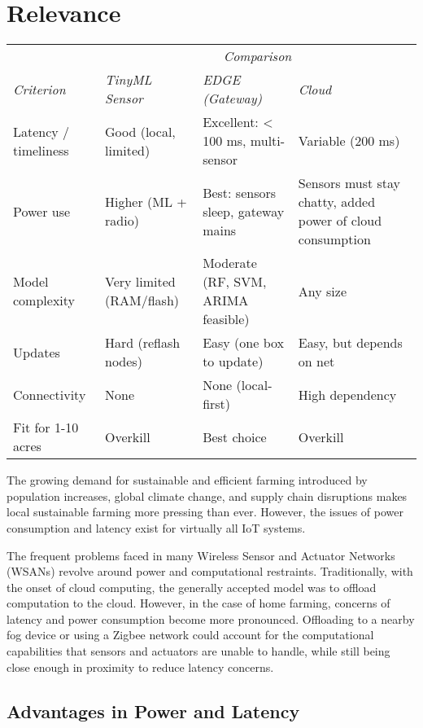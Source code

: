 \documentclass{sigchi}
\begin{document}
\section{Relevance}
\begin{table*}[btp]
	\centering
	\begin{tabular}{l p{4cm} p{4cm} p{4cm}}
		& \multicolumn{3}{c}{\textit{Comparison}} \\
		\cmidrule(r){2-4}
		{\small\textit{Criterion}}
		& {\small\textit{TinyML Sensor}}
		& {\small\textit{EDGE (Gateway)}}
		& {\small\textit{Cloud}} \\
		\midrule
		Latency / timeliness & Good (local, limited) & Excellent: < 100 ms, multi-sensor & Variable (200 ms) \\
		\midrule
		Power use & Higher (ML + radio) & Best: sensors sleep, gateway mains & Sensors must stay chatty, added power of cloud consumption \\
		\midrule
		Model complexity & Very limited (RAM/flash) & Moderate (RF, SVM, ARIMA feasible) & Any size \\
		\midrule
		Updates & Hard (reflash nodes) & Easy (one box to update) & Easy, but depends on net \\
		\midrule
		Connectivity & None & None (local-first) & High dependency \\
		\midrule
		Fit for 1-10 acres & Overkill & Best choice & Overkill \\
	\end{tabular}
\end{table*}

The growing demand for sustainable and efficient farming introduced by population increases, global climate change, and supply chain disruptions makes local sustainable farming more pressing than ever. However, the issues of power consumption and latency exist for virtually all IoT systems.

The frequent problems faced in many Wireless Sensor and Actuator Networks (WSANs) revolve around power and computational restraints. Traditionally, with the onset of cloud computing, the generally accepted model was to offload computation to the cloud. However, in the case of home farming, concerns of latency and power consumption become more pronounced. Offloading to a nearby fog device or using a Zigbee network could account for the computational capabilities that sensors and actuators are unable to handle, while still being close enough in proximity to reduce latency concerns.

\subsection{Advantages in Power and Latency}
\end{document}
